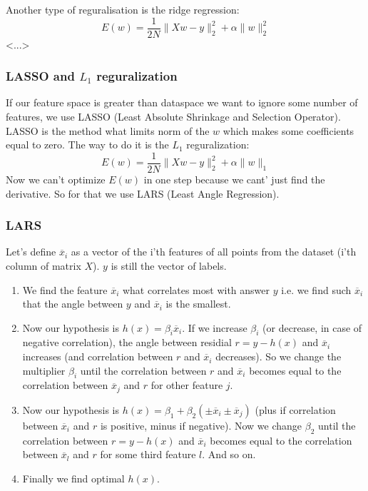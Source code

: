 Another type of reguralisation is the ridge regression:
$$E(w)=\frac{1}{2N}\|Xw-y\|_2^2+\alpha\|w\|_2^2$$
<...>

\subsubsection*{LASSO and $L_1$ reguralization}

If our feature space is greater than dataspace we want to ignore some number of features, we use LASSO (Least Absolute Shrinkage and Selection Operator). LASSO is the method what limits norm of the $w$ which makes some coefficients equal to zero. The way to do it is the $L_1$ reguralization:
$$E(w)=\frac{1}{2N}\|Xw-y\|_2^2+\alpha\|w\|_1$$
Now we can't optimize $E(w)$ in one step because we cant' just find the derivative. So for that we use LARS (Least Angle Regression).

\subsubsection*{LARS}

Let's define $\overline{x}_i$ as a vector of the i'th features of all points from the dataset (i'th column of matrix $X$). $y$ is still the vector of labels.
\begin{enumerate}
	\item We find the feature $\overline{x}_i$ what correlates most with answer $y$ i.e. we find such $\overline{x}_i$ that the angle between $y$ and $\overline{x}_i$ is the smallest.
	\item Now our hypothesis is $h(x)=\beta_i\overline{x}_i$. If we increase $\beta_i$ (or decrease, in case of negative correlation), the angle between residial $r=y-h(x)$ and $\overline{x}_i$ increases (and correlation between $r$ and $\overline{x}_i$ decreases). So we change the multiplier $\beta_i$ until the correlation between $r$ and $\overline{x}_i$ becomes equal to the correlation between $\overline{x}_j$ and $r$ for other feature $j$.
	\item Now our hypothesis is $h(x)=\beta_1+\beta_2(\pm\overline{x}_i\pm\overline{x}_j)$ (plus if correlation between $\overline{x}_i$ and $r$ is positive, minus if negative). Now we change $\beta_2$ until the correlation between $r=y-h(x)$ and $\overline{x}_i$ becomes equal to the correlation between $\overline{x}_l$ and $r$ for some third feature $l$. And so on.
	\item Finally we find optimal $h(x)$.
\end{enumerate}

